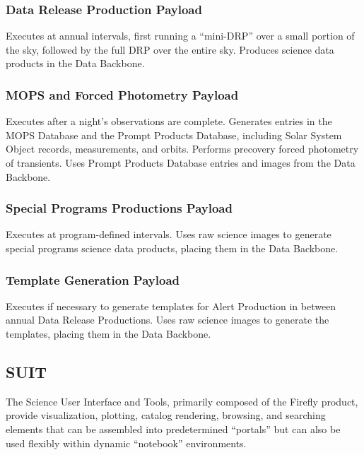 \documentclass[DM,toc,lsstdraft]{lsstdoc}
\begin{document}
\subsubsection{Data Release Production
Payload}\label{data-release-production-payload}

Executes at annual intervals,
first running a ``mini-DRP'' over a small portion of the sky, followed
by the full DRP over the entire sky. Produces science data products in
the Data Backbone.

\subsubsection{MOPS and Forced Photometry Payload}\label{mops-payload}

Executes after a night's
observations are complete. Generates entries in the MOPS Database and
the Prompt Products Database, including Solar System Object records,
measurements, and orbits. Performs precovery forced photometry of
transients. Uses Prompt Products Database entries and images from the Data
Backbone.

\subsubsection{Special Programs Productions
Payload}\label{special-programs-productions-payload}

Executes at program-defined intervals.
Uses raw science images to generate special programs science data products, placing them in the Data Backbone.

\subsubsection{Template Generation
Payload}\label{template-generation-payload}

Executes if necessary to generate templates for Alert Production in between annual
Data Release Productions. Uses raw science images to generate the
templates, placing them in the Data Backbone.

\subsection{SUIT}\label{suit}

The Science User Interface and Tools, primarily composed of the Firefly product, provide visualization, plotting,
catalog rendering, browsing, and searching elements that can be
assembled into predetermined ``portals'' but can also be used flexibly
within dynamic ``notebook'' environments.
\end{document}
